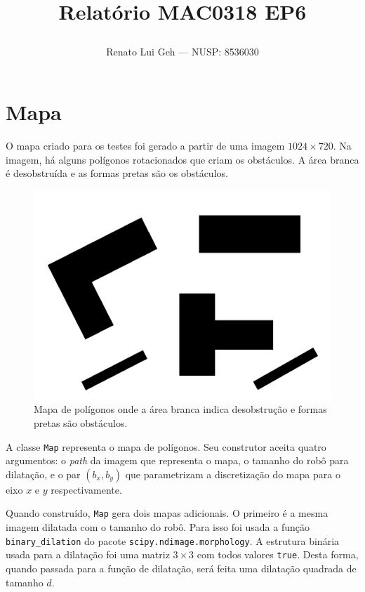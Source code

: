 \documentclass[12pt]{article}
\title{%
  \textbf{Relatório MAC0318 EP6}\\
  \author{Renato Lui Geh --- NUSP\@: 8536030}
}
\date{}
\theoremstyle{plain}
\numberwithin{equation}{section}
\newcommand{\code}[1]{\lstinline[mathescape=true]{#1}}
\begin{document}
\maketitle

\section{Mapa}

O mapa criado para os testes foi gerado a partir de uma imagem $1024\times 720$. Na imagem, há
alguns polígonos rotacionados que criam os obstáculos. A área branca é desobstruída e as formas
pretas são os obstáculos.

\begin{figure}[h]
  \centering\includegraphics[scale=0.4]{imgs/map.png}
  \caption{Mapa de polígonos onde a área branca indica desobstrução e formas pretas são
    obstáculos.}
\end{figure}

A classe \code{Map} representa o mapa de polígonos. Seu construtor aceita quatro argumentos: o
\textit{path} da imagem que representa o mapa, o tamanho do robô para dilatação, e o par $(b_x,
b_y)$ que parametrizam a discretização do mapa para o eixo $x$ e $y$ respectivamente.

Quando construído, \code{Map} gera dois mapas adicionais. O primeiro é a mesma imagem dilatada com
o tamanho do robô. Para isso foi usada a função \code{binary_dilation} do pacote
\code{scipy.ndimage.morphology}. A estrutura binária usada para a dilatação foi uma matriz $3\times
3$ com todos valores \code{true}. Desta forma, quando passada para a função de dilatação, será
feita uma dilatação quadrada de tamanho $d$.
\end{document}
